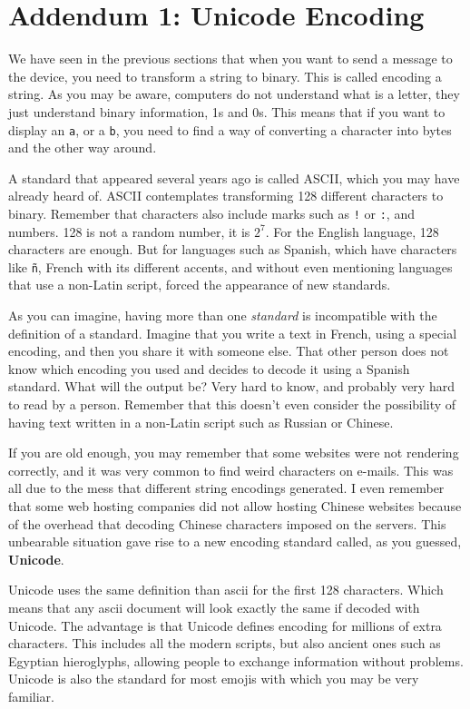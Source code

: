 \section{Addendum 1: Unicode Encoding}\label{section:unicode}
We have seen in the previous sections that when you want to send a message to the device, you need to transform a string to binary. This is called encoding a 
string. As you may be aware, computers do not understand what is a letter, they just understand binary information, 1s and 0s. This means that if you want to display an \texttt{a}, or a \texttt{b}, you need to find a way of converting a 
character into bytes and the other way around. 

A standard that appeared several years ago is called ASCII, which you may have already heard of. ASCII contemplates transforming 128 different characters to binary. Remember that characters also include marks such as \texttt{!} or 
\texttt{:}, and numbers. 128 is not a random number, it is $2^7$. For the English language, 128 characters are enough. But for languages such as Spanish, which have characters like \texttt{ñ}, French with its different accents, and without even mentioning languages that use a non-Latin script, forced the appearance of new standards. 

As you can imagine, having more than one \textit{standard} is incompatible with the definition of a standard. Imagine that you write a text in French, using a special encoding, and then you share it with someone else. That other person does not know which encoding you used and decides to decode it using a Spanish standard. 
What will the output be? Very hard to know, and probably very hard to read by a person. 
Remember that this doesn't even consider the possibility of having text 
written in a non-Latin script such as Russian or Chinese.

If you are old enough, you may remember that some websites were not rendering correctly, and it was very common to find weird characters on e-mails. This was all due to the mess that different string encodings generated. I even remember that some web hosting companies did not allow hosting Chinese websites because of the overhead that decoding Chinese characters imposed on the servers. This unbearable situation gave rise to a new encoding standard called, as you guessed, 
\textbf{Unicode}. 

Unicode uses the same definition than ascii for the first 128 characters. Which means that any ascii document will look exactly the same if decoded with 
Unicode. The advantage is that Unicode defines encoding for millions of extra characters. This includes all the modern scripts, but also ancient ones such as 
Egyptian hieroglyphs, allowing people to exchange information without problems. Unicode is also the standard for most emojis with which you may be very familiar. 

